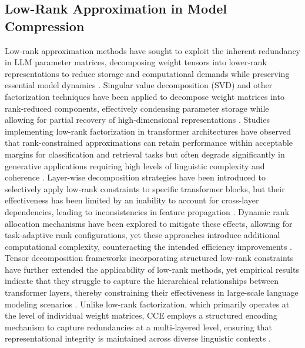 \documentclass{article}
\begin{document}
\subsection{Low-Rank Approximation in Model Compression}
Low-rank approximation methods have sought to exploit the inherent redundancy in LLM parameter matrices, decomposing weight tensors into lower-rank representations to reduce storage and computational demands while preserving essential model dynamics \cite{durheum2024semantic}. Singular value decomposition (SVD) and other factorization techniques have been applied to decompose weight matrices into rank-reduced components, effectively condensing parameter storage while allowing for partial recovery of high-dimensional representations \cite{mcintosh2024inadequacy}. Studies implementing low-rank factorization in transformer architectures have observed that rank-constrained approximations can retain performance within acceptable margins for classification and retrieval tasks but often degrade significantly in generative applications requiring high levels of linguistic complexity and coherence \cite{whitbeck2024evaluating}. Layer-wise decomposition strategies have been introduced to selectively apply low-rank constraints to specific transformer blocks, but their effectiveness has been limited by an inability to account for cross-layer dependencies, leading to inconsistencies in feature propagation \cite{torrington2024adaptive}. Dynamic rank allocation mechanisms have been explored to mitigate these effects, allowing for task-adaptive rank configurations, yet these approaches introduce additional computational complexity, counteracting the intended efficiency improvements \cite{helms2024emergent}. Tensor decomposition frameworks incorporating structured low-rank constraints have further extended the applicability of low-rank methods, yet empirical results indicate that they struggle to capture the hierarchical relationships between transformer layers, thereby constraining their effectiveness in large-scale language modeling scenarios \cite{atox2024evaluating}. Unlike low-rank factorization, which primarily operates at the level of individual weight matrices, CCE employs a structured encoding mechanism to capture redundancies at a multi-layered level, ensuring that representational integrity is maintained across diverse linguistic contexts \cite{whitney2024adaptive}.
\end{document}
